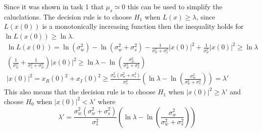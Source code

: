 Since it was shown in task 1 that $\mu_s \simeq 0$ this can be used to simplify the caluclations. The decision rule is to choose $H_1$ when $L(x) \geq \lambda$, since $L(x(0))$ is a monotonically increasing function then the inequality holds for $\ln L(x(0)) \geq \ln\lambda$.
\begin{align}
    \ln L(x(0)) = \ln (\sigma_w^2)-\ln (\sigma_w^2+\sigma_s^2)-\frac{1}{\sigma_w^2+\sigma_s^2}|x(0)|^2+\frac{1}{\sigma_w^2}|x(0)|^2 \geq \ln\lambda\nonumber\\
    (\frac{1}{\sigma_w^2}+\frac{1}{\sigma_s^2+\sigma_w^2})|x(0)|^2 \geq \ln\lambda-\ln (\frac{\sigma_w^2}{\sigma_w^2+\sigma_s^2})\nonumber\\
    |x(0)|^2 = x_R(0)^2+x_I(0)^2 \geq \frac{\sigma_w^2(\sigma_w^2+\sigma_s^2)}{\sigma_s^2}(\ln\lambda-\ln (\frac{\sigma_w^2}{\sigma_w^2+\sigma_s^2})) = \lambda'\nonumber
\end{align}
This also means that the decision rule is to choose $H_1$ when $|x(0)|^2\geq\lambda'$ and choose $H_0$ when $|x(0)|^2<\lambda'$ where
\begin{equation}
    \lambda' = \frac{\sigma_w^2(\sigma_w^2+\sigma_s^2)}{\sigma_s^2}(\ln\lambda-\ln (\frac{\sigma_w^2}{\sigma_w^2+\sigma_s^2}))
\end{equation}\label{eq:lambda_prime}

